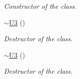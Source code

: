 \begin{DoxyCompactItemize}
\begin{DoxyCompactList}\small\item\em Constructor of the class. \end{DoxyCompactList}\item 
\hyperlink{class_u3_a0ce404f4cd63bc845a9379e7fc532c90}{$\sim$\+U3} ()
\begin{DoxyCompactList}\small\item\em Destructor of the class. \end{DoxyCompactList}\item 
\hyperlink{class_u3_a0ce404f4cd63bc845a9379e7fc532c90}{$\sim$\+U3} ()
\begin{DoxyCompactList}\small\item\em Destructor of the class. \end{DoxyCompactList}\end{DoxyCompactItemize}
